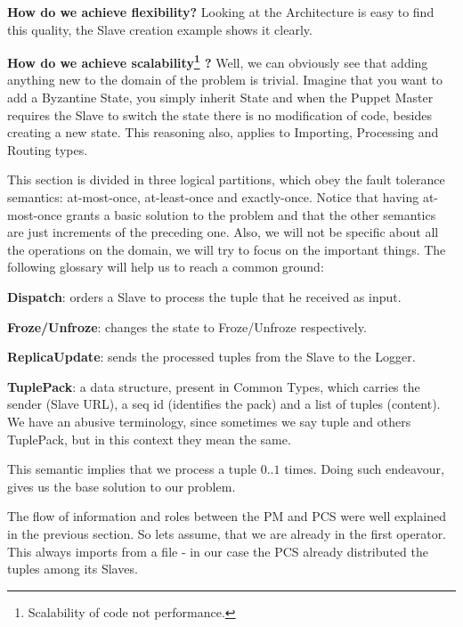 \documentclass[times, 10pt,twocolumn]{article}
\begin{document}
\textbf{How do we achieve flexibility?} Looking at the Architecture is easy to find this quality, the Slave creation example shows it clearly.

\textbf{How do we achieve scalability\footnote{%
		Scalability of code not performance.
	} 
	?} Well, we can obviously see that adding anything new to the domain of the problem is trivial. Imagine that you want to add a Byzantine State, you simply inherit State and when the Puppet Master requires the Slave to switch the state there is no modification of code, besides creating a new state. This reasoning also, applies to Importing, Processing and Routing types.



This section is divided in three logical partitions, which obey the fault tolerance semantics: at-most-once, at-least-once and exactly-once. Notice that having at-most-once grants a basic solution to the problem and that the other semantics are just increments of the preceding one. Also, we will not be specific about all the operations on the domain, we will try to focus on the important things. The following glossary will help us to reach a common ground:

\textbf{Dispatch}: orders a Slave to process the tuple that he received as input.

\textbf{Froze/Unfroze}: changes the state to Froze/Unfroze respectively.

\textbf{ReplicaUpdate}: sends the processed tuples from the Slave to the Logger.

\textbf{TuplePack}: a data structure, present in Common Types, which carries the sender (Slave URL), a seq id (identifies the pack) and a list of tuples (content). We have an abusive terminology, since sometimes we say tuple and others TuplePack, but in this context they mean the same.


This semantic implies that we process a tuple $0..1$ times. Doing such endeavour, gives us the base solution to our problem.

The flow of information and roles between the PM and PCS were well explained in the previous section. So lets assume, that we are already in the first operator. This always imports from a file - in our case the PCS already distributed the tuples among its Slaves. 
\end{document}
